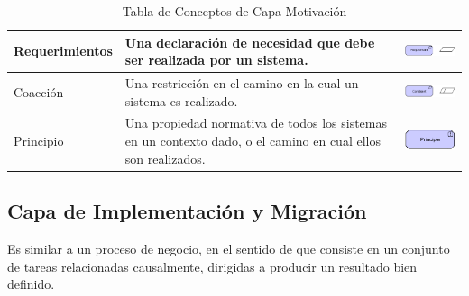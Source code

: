\begin{table}[H]
\begin{tabular}{| m{4cm} | m{4cm} | m{4cm} | }
		\hline
		\centering\vspace{1.52mm}Requerimientos& \vspace{1.52mm}Una declaración de necesidad que debe ser realizada por un sistema.& \vspace{1.52mm}\includegraphics[width=40mm]{arquitectura/imagenes/55} \\
		\hline
		\centering\vspace{1.52mm}Coacción& \vspace{1.52mm}Una restricción en el camino en la cual un sistema es realizado.& \vspace{1.52mm}\includegraphics[width=40mm]{arquitectura/imagenes/56} \\
		\hline
		\centering\vspace{1.52mm}Principio& \vspace{1.52mm}Una propiedad normativa de todos los sistemas en un contexto dado, o el camino en cual ellos son realizados.& \vspace{1.52mm}\includegraphics[width=30mm]{arquitectura/imagenes/57} \\
		\hline
	\end{tabular}
	\caption{Tabla de Conceptos de Capa Motivación}
	\label{fig:motivacion}
\end{table}

\subsection{Capa de Implementación y  Migración}

 Es similar a un proceso de negocio, en el sentido de que consiste en un conjunto de tareas relacionadas causalmente, dirigidas a producir un resultado bien definido.

